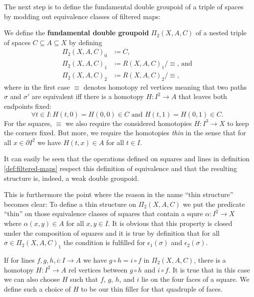 The next step is to define the fundamental double groupoid of a triple of
spaces by modding out equivalence classes of filtered maps:

\begin{defn}
We define the \textbf{fundamental double groupoid} $\Pi_2(X, A, C)$ of a nested
triple of spaces $C \subseteq A \subseteq X$ by defining
\begin{align*}
\Pi_2(X, A, C)_0 &\coloneqq C \text{,}\\
\Pi_2(X, A, C)_1 &\coloneqq R(X,A,C)_1 / \equiv \text{, and} \\
\Pi_2(X, A, C)_2 &\coloneqq R(X,A,C)_2 / \equiv \text{,}
\end{align*}
where in the first case $\equiv$ denotes homotopy rel vertices meaning that two
paths $\sigma$ and $\sigma'$ are equivalent iff there is a homotopy
$H : I^2 \to A$ that leaves both endpoints fixed:
\begin{equation*}
\forall t \in I : H(t,0) = H(0,0) \in C \text{ and } H(t,1) = H(0,1) \in C \text{.}
\end{equation*}
For the squares, $\equiv$ we also require the considered homotopies 
$H : I^3 \to X$ to keep the corners fixed.
But more, we require the homotopies \emph{thin} in the sense that for all
$x \in \partial I^2$ we have $H(t,x) \in A$ for all $t \in I$.

It can easily be seen that the operations defined on squares and lines in
definition \ref{def:filtered-maps} respect this definition of equivalence and that
the resulting structure is, indeed, a weak double groupoid.

This is furthermore the point where the reason in the name ``thin structure'' becomes
clear:
To define a thin structure on $\Pi_2(X, A, C)$ we put the predicate ``thin''
on those equivalence classes of squares that contain a squre $\alpha : I^2 \to X$
where $\alpha(x, y) \in A$ for all $x, y \in I$.
It is obvious that this property is closed under the composition of squares and
it is true by definition that for all $\sigma \in \Pi_2(X, A, C)_1$ the condition
is fulfilled for $\epsilon_1(\sigma)$ and $\epsilon_2(\sigma)$.

If for lines $f, g, h, i : I \to A$ we have $g \circ h = i \circ f$ in
$\Pi_2(X, A, C)$, there is a homotopy $H : I^2 \to A$ rel vertices between
$g \circ h$ and $i \circ f$.
It is true that in this case we can also choose $H$ such that $f$, $g$, $h$, and
$i$ lie on the four faces of a square.
We define such a choice of $H$ to be our thin filler for that quadruple of faces.


\end{defn}

